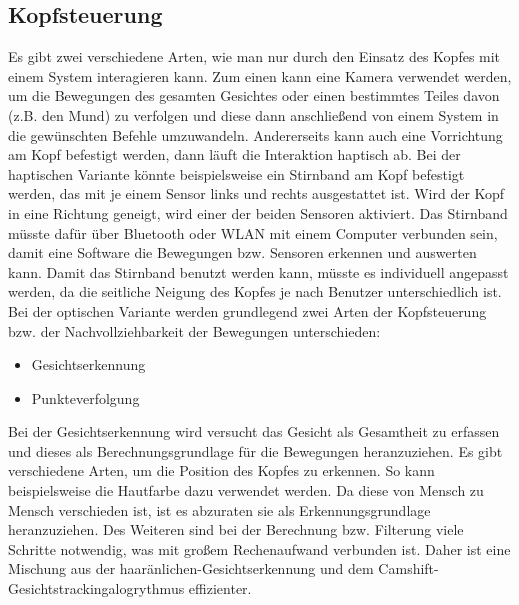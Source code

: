 \subsection{Kopfsteuerung}

Es gibt zwei verschiedene Arten, wie man nur durch den Einsatz des Kopfes mit einem System interagieren kann. Zum einen kann eine Kamera verwendet werden, um die Bewegungen des gesamten Gesichtes oder einen bestimmtes Teiles davon (z.B. den Mund) zu verfolgen und diese dann anschließend von einem System in die gewünschten Befehle umzuwandeln. Andererseits kann auch eine Vorrichtung am Kopf befestigt werden, dann läuft die Interaktion haptisch ab.
\newline \newline
Bei der haptischen Variante könnte beispielsweise ein Stirnband am Kopf befestigt werden, das mit je einem Sensor links und rechts ausgestattet ist. Wird der Kopf in eine Richtung geneigt, wird einer der beiden Sensoren aktiviert. Das Stirnband müsste dafür über Bluetooth oder WLAN mit einem Computer verbunden sein, damit eine Software die Bewegungen bzw. Sensoren erkennen und auswerten kann. Damit das Stirnband benutzt werden kann, müsste es individuell angepasst werden, da die seitliche Neigung des Kopfes je nach Benutzer unterschiedlich ist.
\newline \newline
Bei der optischen Variante werden grundlegend zwei Arten der Kopfsteuerung bzw. der Nachvollziehbarkeit der Bewegungen unterschieden:
\begin{itemize}
      \item Gesichtserkennung
      \item Punkteverfolgung
\end{itemize}
\vspace{\baselineskip}
Bei der Gesichtserkennung wird versucht das Gesicht als Gesamtheit zu erfassen und dieses als Berechnungsgrundlage für die Bewegungen heranzuziehen. Es gibt verschiedene Arten, um die Position des Kopfes zu erkennen. So kann beispielsweise die Hautfarbe dazu verwendet werden. Da diese von Mensch zu Mensch verschieden ist, ist es abzuraten sie als Erkennungsgrundlage heranzuziehen. Des Weiteren sind bei der Berechnung bzw. Filterung viele Schritte notwendig, was mit großem Rechenaufwand verbunden ist. Daher ist eine Mischung aus der haaränlichen-Gesichtserkennung und dem Camshift-Gesichtstrackingalogrythmus effizienter.
\newline \newline
